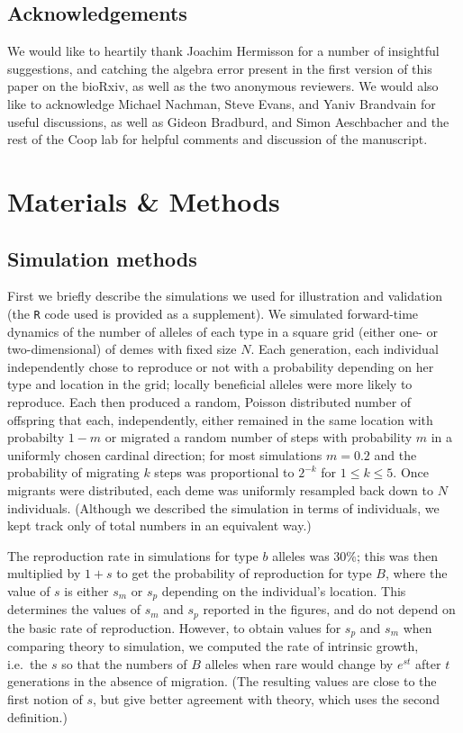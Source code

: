 \documentclass{article}
\begin{document}
\subsection*{Acknowledgements}
We would like to heartily thank Joachim Hermisson for a number of insightful suggestions,
and catching the algebra error present in the first version of this paper on the bioRxiv,
as well as the two anonymous reviewers.
We would also like to acknowledge Michael Nachman, Steve Evans, and Yaniv Brandvain for useful discussions, 
as well as Gideon Bradburd, and Simon Aeschbacher and the rest of the Coop lab
for helpful comments and discussion of the manuscript.

\section*{Materials \& Methods}

\subsection{Simulation methods}
\label{ss:simulations}

First we briefly describe the simulations we used for illustration and validation
(the \texttt{R} code used is provided as a supplement).
We simulated forward-time dynamics of the number of alleles of each type in a square grid (either one- or two-dimensional) of demes with fixed size $N$.
Each generation, each individual independently chose to reproduce or not with a probability depending on her type and location in the grid;
locally beneficial alleles were more likely to reproduce.
Each then produced a random, Poisson distributed number of offspring that each, independently, 
either remained in the same location with probabilty $1-m$ or
migrated a random number of steps with probability $m$
in a uniformly chosen cardinal direction;
for most simulations $m=0.2$ and
the probability of migrating $k$ steps was proportional to $2^{-k}$ for $1\le k \le 5$.
Once migrants were distributed, each deme was uniformly resampled back down to $N$ individuals.
(Although we described the simulation in terms of individuals,
we kept track only of total numbers in an equivalent way.)

The reproduction rate in simulations for type $b$ alleles was 30\%; 
this was then multiplied by $1+s$ to get the probability of reproduction for type $B$,
where the value of $s$ is either $s_m$ or $s_p$ depending on the individual's location.
This determines the values of $s_m$ and $s_p$ reported in the figures, 
and do not depend on the basic rate of reproduction.
However, to obtain values for $s_p$ and $s_m$ when comparing theory to simulation,
we computed the rate of intrinsic growth, 
i.e.\ the $s$ so that the numbers of $B$ alleles when rare would change by $e^{st}$ after $t$ generations
in the absence of migration.
(The resulting values are close to the first notion of $s$,
but give better agreement with theory,
which uses the second definition.)
\end{document}
